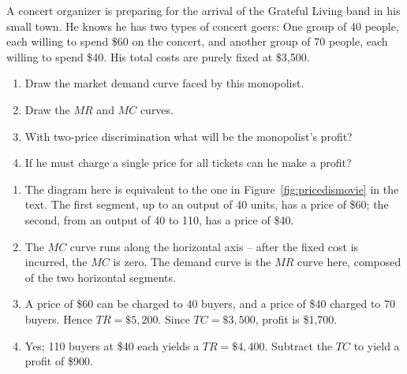 \begin{enumialphparenastyle}
\begin{econex}\label{ex:ch10ex7}
A concert organizer is preparing for the arrival of the Grateful Living band in his small town. He knows he has two types of concert goers: One group of 40 people, each willing to spend \$60 on the concert, and another group of 70 people, each willing to spend \$40. His total costs are purely fixed at \$3,500.
\begin{enumerate}
\item	Draw the market demand curve faced by this monopolist.
\item	Draw the $MR$ and $MC$ curves.
\item	With two-price discrimination what will be the monopolist's profit?
\item	If he must charge a single price for all tickets can he make a profit?
\end{enumerate}
\begin{econsolution}
\begin{enumerate}
\item	The diagram here is equivalent to the one in Figure~\ref{fig:pricedismovie} in the text. The first segment, up to an output of 40 units, has a price of \$60; the second, from an output of 40 to 110, has a price of \$40.
\item	The $MC$ curve runs along the horizontal axis -- after the fixed cost is incurred, the $MC$ is zero. The demand curve is the $MR$ curve here, composed of the two horizontal segments.
\item	A price of \$60 can be charged to 40 buyers, and a price of \$40 charged to 70 buyers. Hence $TR=\$5,200$. Since $TC=\$3,500$, profit is \$1,700.
\item	Yes; 110 buyers at \$40 each yields a $TR=\$4,400$. Subtract the $TC$ to yield a profit of \$900.
\end{enumerate}
\begin{center}
\end{center}
\end{econsolution}
\end{econex}


\end{enumialphparenastyle}
